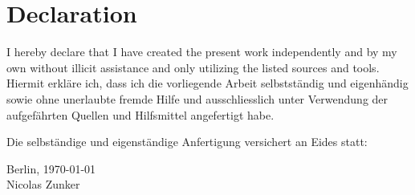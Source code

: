 
\cleardoublepage
\section*{Declaration}
I hereby declare that I have created the present work independently and by my own without illicit assistance and only utilizing the listed sources and tools.\\

Hiermit erkläre ich, dass ich die vorliegende Arbeit selbstständig und eigenhändig sowie ohne unerlaubte fremde Hilfe und ausschliesslich unter Verwendung der aufgefährten Quellen und Hilfsmittel angefertigt habe.

Die selbständige und eigenständige Anfertigung versichert an Eides statt:
\begin{center}
Berlin, \today \\[3pc]
Nicolas Zunker
\end{center}
